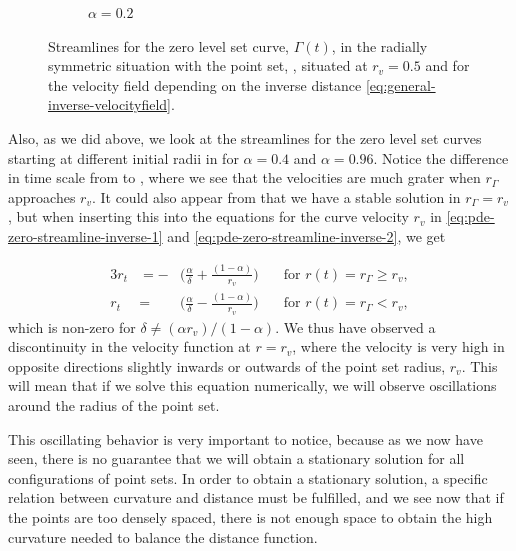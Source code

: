 \begin{figure}
\begin{subfigure}{.5\linewidth}
        \caption{$\alpha=0.2$}
        \label{fig:inverse-sub2}
    \end{subfigure}
    \caption[Streamlines for alternative velocity field]{Streamlines for the zero level set curve, $\Gamma(t)$, in the radially symmetric situation with the point set, \pointset, situated at $r_v=0.5$ and for the velocity field depending on the inverse distance \eqref{eq:general-inverse-velocityfield}.}
    \label{fig:total-streamline-inverse}
\end{figure}

Also, as we did above, we look at the streamlines for the zero level set curves starting at different initial radii in  for $\alpha=0.4$ and $\alpha=0.96$. Notice the difference in time scale from  to , where we see that the velocities are much grater when $r_{\Gamma}$ approaches $r_v$. It could also appear from  that we have a stable solution in $r_{\Gamma}=r_v$, but when inserting this into the equations for the curve velocity $r_v$ in \eqref{eq:pde-zero-streamline-inverse-1} and \eqref{eq:pde-zero-streamline-inverse-2}, we get

\begin{alignat}{3}
    r_t &= -&\bigg(\frac{\alpha}{\delta} + \frac{(1-\alpha)}{r_v}\bigg) \quad &\text{for }r(t) = r_{\Gamma}\geq r_v, \label{eq:pde-streamline-inverse-1}\\
    r_t &= &\bigg(\frac{\alpha}{\delta} -  \frac{(1-\alpha)}{r_v}\bigg) \quad &\text{for }r(t) = r_{\Gamma}<r_v,\label{eq:pde-streamline-inverse-2}
\end{alignat}
which is non-zero for $\delta \neq (\alpha r_v)/(1-\alpha)$. We thus have observed a discontinuity in the velocity function at $r=r_v$, where the velocity is very high in opposite directions slightly inwards or outwards of the point set radius, $r_v$. This will mean that if we solve this equation numerically, we will observe oscillations around the radius of the point set.

This oscillating behavior is very important to notice, because as we now have seen, there is no guarantee that we will obtain a stationary solution for all configurations of point sets. In order to obtain a stationary solution, a specific relation between curvature and distance must be fulfilled, and we see now that if the points are too densely spaced, there is not enough space to obtain the high curvature needed to balance the distance function.

